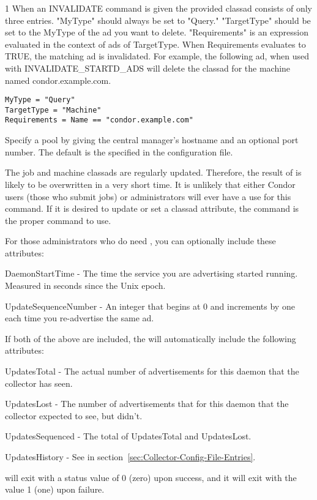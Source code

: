 \begin{ManPage}{\label{man-condor-advertise}}{1}
When an INVALIDATE command is given the provided classad consists
of only three entries.  "MyType" should always be set to "Query."
"TargetType" should be set to the MyType of the ad you want to
delete.  "Requirements" is an expression evaluated in the context
of ads of TargetType.  When Requirements evaluates to TRUE, the
matching ad is invalidated.  For example, the following ad, when
used with INVALIDATE\_STARTD\_ADS will delete the classad for the
machine named condor.example.com.
\begin{verbatim}
MyType = "Query"
TargetType = "Machine"
Requirements = Name == "condor.example.com"
\end{verbatim}


\begin{Options}
    \ToolArgsBaseDesc
            {Specify a pool by
            giving the central manager's hostname and an optional port
	    number.  The default is the
	     specified in the configuration file.}
\end{Options}

\GenRem
The job and machine classads are regularly updated.
Therefore, the result of  is likely to be
overwritten in a very short time.
It is unlikely that either Condor users (those who submit jobs)
or administrators will ever have a use for this command.
If it is desired to update or set a classad attribute, the
 command is the proper command to use.

For those administrators who do need , you can 
optionally include these attributes:

DaemonStartTime - The time the service you are advertising
started running.  Measured in seconds since the Unix epoch.

UpdateSequenceNumber - An integer that begins at 0 and increments by
one each time you re-advertise the same ad.

If both of the above are included, the  will
automatically include the following attributes:

UpdatesTotal - The actual number of advertisements for this
daemon that the collector has seen.

UpdatesLost - The number of advertisements that for this daemon
that the collector expected to see, but didn't.

UpdatesSequenced - The total of UpdatesTotal and UpdatesLost.

UpdatesHistory - See  in
section~\ref{sec:Collector-Config-File-Entries}.

\ExitStatus

 will exit with a status value of 0 (zero) upon success,
and it will exit with the value 1 (one) upon failure.

\end{ManPage}
